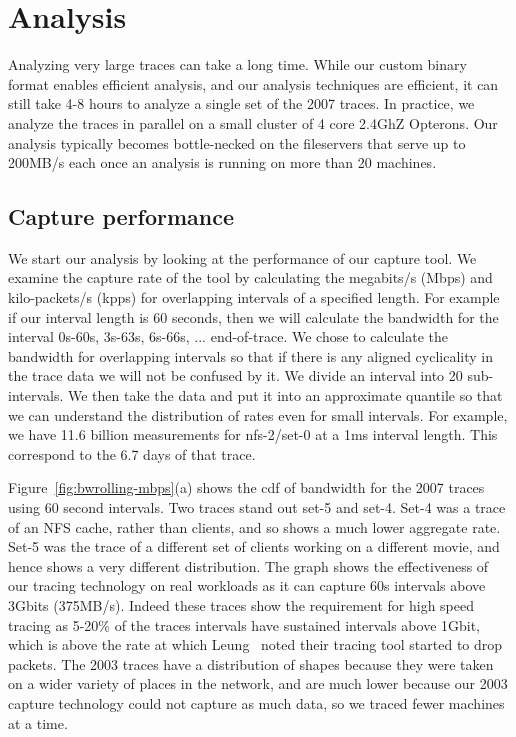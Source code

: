 \section{Analysis}
\label{sec:analysis}

Analyzing very large traces can take a long time.  While our custom
binary format enables efficient analysis, and our analysis techniques
are efficient, it can still take 4-8 hours to analyze a single set of
the 2007 traces.  In practice, we analyze the traces in parallel on a
small cluster of 4 core 2.4GhZ Opterons.  Our analysis typically
becomes bottle-necked on the fileservers that serve up to 200MB/s each
once an analysis is running on more than 20 machines.

\subsection{Capture performance}

We start our analysis by looking at the performance of our capture
tool.  We examine the capture rate of the tool by calculating the
megabits/s (Mbps) and kilo-packets/s (kpps) for overlapping intervals
of a specified length.  For example if our interval length is 60
seconds, then we will calculate the bandwidth for the interval 0s-60s,
3s-63s, 6s-66s, ... end-of-trace.  We chose to calculate the bandwidth
for overlapping intervals so that if there is any aligned cyclicality
in the trace data we will not be confused by it.  We divide an
interval into 20 sub-intervals.  We then take the data and put it into
an approximate quantile so that we can understand the distribution of
rates even for small intervals.  For example, we have 11.6 billion
measurements for nfs-2/set-0 at a 1ms interval length.  This
correspond to the 6.7 days of that trace.

Figure~\ref{fig:bwrolling-mbps}(a) shows the cdf of bandwidth for the
2007 traces using 60 second intervals.  Two traces stand out set-5 and
set-4.  Set-4 was a trace of an NFS cache, rather than clients, and so
shows a much lower aggregate rate.  Set-5 was the trace of a different
set of clients working on a different movie, and hence shows a very
different distribution.  The graph shows the effectiveness of our
tracing technology on real workloads as it can capture 60s intervals
above 3Gbits (375MB/s).  Indeed these traces show the requirement for
high speed tracing as 5-20\% of the traces intervals have sustained
intervals above 1Gbit, which is above the rate at which
Leung~\cite{LeungUsenix08} noted their tracing tool started to drop
packets.  The 2003 traces have a distribution of shapes because they
were taken on a wider variety of places in the network, and are much
lower because our 2003 capture technology could not capture as much
data, so we traced fewer machines at a time.


